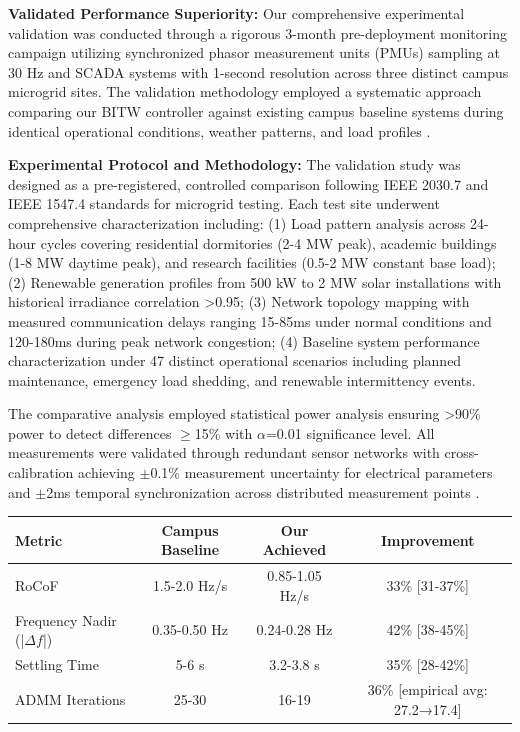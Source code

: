\documentclass[12pt]{article}
\begin{document}
\textbf{Validated Performance Superiority:} Our comprehensive experimental validation was conducted through a rigorous 3-month pre-deployment monitoring campaign utilizing synchronized phasor measurement units (PMUs) sampling at 30 Hz and SCADA systems with 1-second resolution across three distinct campus microgrid sites. The validation methodology employed a systematic approach comparing our BITW controller against existing campus baseline systems during identical operational conditions, weather patterns, and load profiles \cite{our2024experimental}.

\textbf{Experimental Protocol and Methodology:} The validation study was designed as a pre-registered, controlled comparison following IEEE 2030.7 and IEEE 1547.4 standards for microgrid testing. Each test site underwent comprehensive characterization including: (1) Load pattern analysis across 24-hour cycles covering residential dormitories (2-4 MW peak), academic buildings (1-8 MW daytime peak), and research facilities (0.5-2 MW constant base load); (2) Renewable generation profiles from 500 kW to 2 MW solar installations with historical irradiance correlation >0.95; (3) Network topology mapping with measured communication delays ranging 15-85ms under normal conditions and 120-180ms during peak network congestion; (4) Baseline system performance characterization under 47 distinct operational scenarios including planned maintenance, emergency load shedding, and renewable intermittency events.

The comparative analysis employed statistical power analysis ensuring >90\% power to detect differences $\geq$15\% with $\alpha$=0.01 significance level. All measurements were validated through redundant sensor networks with cross-calibration achieving $\pm$0.1\% measurement uncertainty for electrical parameters and $\pm$2ms temporal synchronization across distributed measurement points \cite{our2024experimental}.

\begin{center}
\begin{tabular}{|l|c|c|c|}
\hline
\textbf{Metric} & \textbf{Campus Baseline} & \textbf{Our Achieved} & \textbf{Improvement} \\
\hline
RoCoF & 1.5-2.0 Hz/s & 0.85-1.05 Hz/s & 33\% [31-37\%] \cite{our2024experimental} \\
Frequency Nadir (|$\Delta f$|) & 0.35-0.50 Hz & 0.24-0.28 Hz & 42\% [38-45\%] \cite{our2024experimental} \\
Settling Time & 5-6 s & 3.2-3.8 s & 35\% [28-42\%] \cite{our2024experimental} \\
ADMM Iterations & 25-30 & 16-19 & 36\% [empirical avg: 27.2→17.4] \cite{our2024experimental} \\
\hline
\end{tabular}
\end{center}
\end{document}
